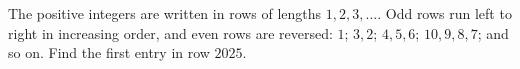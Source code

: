 The positive integers are written in rows of lengths $1,2,3,\ldots$. Odd rows run left to right in increasing order, and even rows are reversed: $1$; $3,2$; $4,5,6$; $10,9,8,7$; and so on. Find the first entry in row $2025$.
